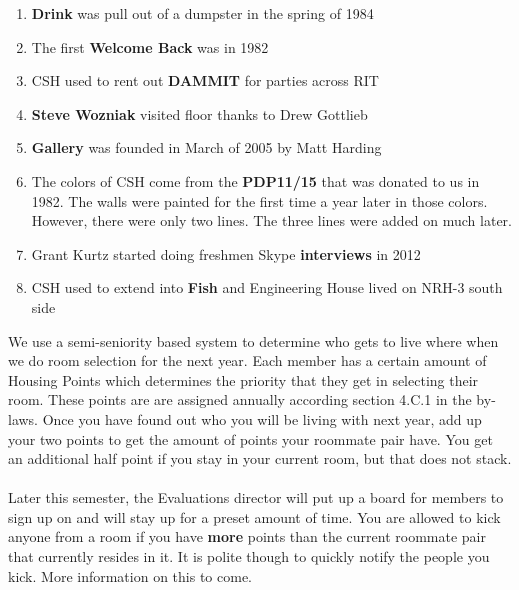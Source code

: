 \documentclass[9pt]{extarticle} %
\begin{document}
\begin{minipage}[t]{.61\linewidth}
\begin{enumerate}
\item \textbf{Drink} was pull out of a dumpster in the spring of 1984
\item The first \textbf{Welcome Back} was in 1982
\item CSH used to rent out \textbf{DAMMIT} for parties across RIT
\item \textbf{Steve Wozniak} visited floor thanks to Drew Gottlieb
\item \textbf{Gallery} was founded in March of 2005 by Matt Harding
\item The colors of CSH come from the \textbf{PDP11/15} that was 
	donated to us in 1982. The walls were painted for the first 
	time a year later in those colors. However, there were only
	two lines. The three lines were added on much later.
\item Grant Kurtz started doing freshmen Skype \textbf{interviews} in 2012
\item CSH used to extend into \textbf{Fish} and Engineering House lived on
NRH-3 south side
\end{enumerate}

\hypertarget{thirdnews}{} 

We use a semi-seniority based system to determine who gets to live 
where when we do room selection for the next year. Each member has a
certain amount of Housing Points which determines the priority that
they get in selecting their room. These points are are assigned annually
according section 4.C.1 in the by-laws. Once you have found out who 
you will be living with next year, add up your two points to get the
amount of points your roommate pair have. You get an additional half
point if you stay in your current room, but that does not stack. \\
\\
Later this semester, the Evaluations director will put up a board for members to sign up on and will stay up for a preset amount of time. You are allowed to kick anyone from a room if you have \textbf{more} points than the current roommate pair that currently resides in it. It is polite though to quickly notify the people you kick. More information on this
to come.


\end{minipage} %
\end{document}
